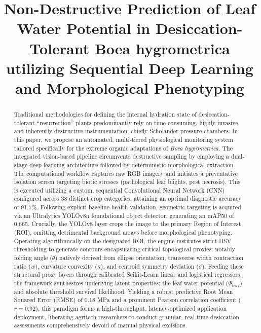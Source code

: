 \documentclass[conference]{IEEEtran}
\begin{document}
\title{Non-Destructive Prediction of Leaf Water Potential in Desiccation-Tolerant Boea hygrometrica utilizing Sequential Deep Learning and Morphological Phenotyping}

\author{
\and
{}
}

\maketitle

\begin{abstract}
Traditional methodologies for defining the internal hydration state of desiccation-tolerant ``resurrection'' plants predominantly rely on time-consuming, highly invasive, and inherently destructive instrumentation, chiefly Scholander pressure chambers. In this paper, we propose an automated, multi-tiered physiological monitoring system tailored specifically for the extreme organic adaptations of \textit{Boea hygrometrica}. The integrated vision-based pipeline circumvents destructive sampling by employing a dual-stage deep learning architecture followed by deterministic morphological extraction. The computational workflow captures raw RGB imagery and initiates a preventative isolation screen targeting biotic stresses (pathological leaf blights, pest necrosis). This is executed utilizing a custom, sequential Convolutional Neural Network (CNN) configured across 38 distinct crop categories, attaining an optimal diagnostic accuracy of 91.7\%. Following explicit baseline health validation, geometric targeting is acquired via an Ultralytics YOLOv8n foundational object detector, generating an mAP50 of 0.665. Crucially, the YOLOv8 layer crops the image to the primary Region of Interest (ROI), omitting detrimental background arrays before morphological phenotyping. Operating algorithmically on the designated ROI, the engine institutes strict HSV thresholding to generate contours encapsulating critical topological proxies: notably folding angle ($\theta$) natively derived from ellipse orientation, transverse width contraction ratio ($w$), curvature convexity ($\kappa$), and centroid symmetry deviation ($\sigma$). Feeding these structural proxy layers through calibrated Scikit-Learn linear and logistical regressors, the framework synthesizes underlying latent properties: the leaf water potential ($\Psi_{leaf}$) and absolute threshold survival likelihood. Yielding a robust predictive Root Mean Squared Error (RMSE) of 0.18 MPa and a prominent Pearson correlation coefficient ($r=0.92$), this paradigm forms a high-throughput, latency-optimized application deployment, liberating agritech researchers to conduct granular, real-time desiccation assessments comprehensively devoid of manual physical excisions.
\end{abstract}
\end{document}
